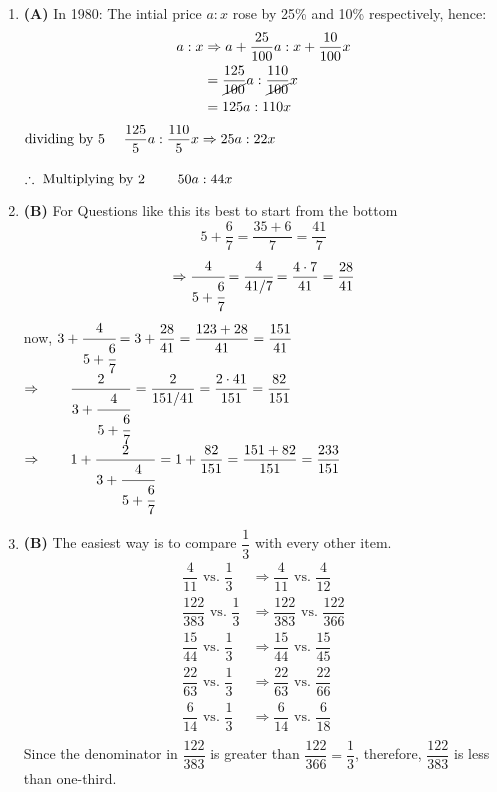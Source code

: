 \begin{multicols}{2}
\begin{enumerate}[label={\textbf{\arabic*.}}]
    \item \textbf{(A)} In 1980: The intial price \(a : x\) rose by 25\% and 10\% respectively, hence: 
        \begin{align*}
        a:x &\Rightarrow  a + \dfrac{25}{100}a : x + \dfrac{10}{100}x  \\
        & = \dfrac{125}{\cancel{100}}a : \dfrac{110}{\cancel{100}}x \\ 
        &= {125}a : 110x \\
    \end{align*}
    \(\text{dividing by 5 } \hspace{10px} \dfrac{125}{5} a : \dfrac{110}{5} x  \Rightarrow 25a : 22x\) \\\\
    \(\therefore \text{ Multiplying by 2 } \hspace{20px}  50a : 44x \)

    \item \textbf{(B)} For Questions like this its best to start from the bottom \\
    \[5 + \dfrac{6}{7} = \dfrac{35 + 6}{7} = \dfrac{41}{7} \] 
     \[\Rightarrow \cfrac{4}{5 + \cfrac{6}{7}} = \cfrac{4}{41/7} = \dfrac{4 \cdot 7}{41} = \dfrac{28}{41}\]
    now, \(3 + \cfrac{4}{5 + \cfrac{6}{7}} = 3 + \dfrac{28}{41} = \dfrac{123 + 28}{41} = \dfrac{151}{41} \)  \vspace{10pt} \\
    \(\Rightarrow \hspace{20px} \dfrac{2}{3 + \cfrac{4}{5 + \cfrac{6}{7}}} = \dfrac{2}{151/41} = \dfrac{2 \cdot 41}{151} = \dfrac{82}{151} \) \vspace{10pt} \\
    \(\Rightarrow \hspace{20px} 1 + \dfrac{2}{3 + \cfrac{4}{5 + \cfrac{6}{7}}} = 1 + \dfrac{82}{151} = \dfrac{151 + 82}{151} = \dfrac{233}{151} \)
    
    \item \textbf{(B)} The easiest way is to compare \(\dfrac{1}{3}\) with every other item.
    \begin{align*}
    \dfrac{4}{11} \text{ vs. } \dfrac{1}{3} &\Rightarrow \dfrac{4}{11} \text{ vs. } \dfrac{4}{12} \\
    \dfrac{122}{383} \text{ vs. } \dfrac{1}{3} &\Rightarrow \dfrac{122}{383} \text{ vs. } \dfrac{122}{366} \\
    \dfrac{15}{44} \text{ vs. } \dfrac{1}{3} &\Rightarrow \dfrac{15}{44} \text{ vs. } \dfrac{15}{45} \\
    \dfrac{22}{63} \text{ vs. } \dfrac{1}{3} &\Rightarrow \dfrac{22}{63} \text{ vs. } \dfrac{22}{66} \\
    \dfrac{6}{14} \text{ vs. } \dfrac{1}{3} &\Rightarrow \dfrac{6}{14} \text{ vs. } \dfrac{6}{18} \\
    \end{align*}
    Since the denominator in \(\dfrac{122}{383}\) is greater than \(\dfrac{122}{366} = \dfrac{1}{3}\), therefore, \(\dfrac{122}{383}\) is less than one-third.
    

\end{enumerate}
\end{multicols}
